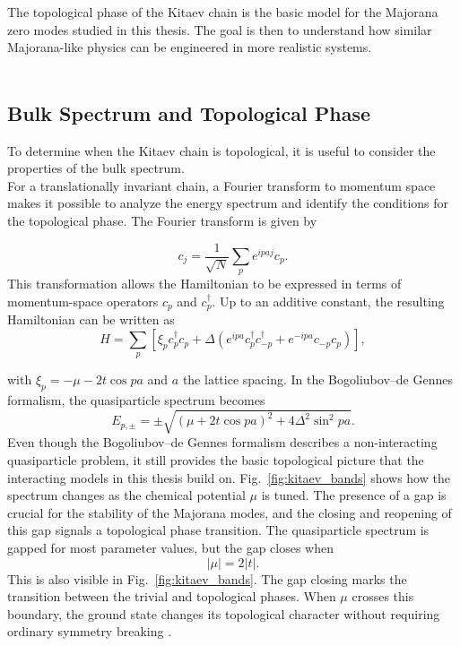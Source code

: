 The topological phase of the Kitaev chain is the basic model for the Majorana zero modes studied in this thesis. The goal is then to understand how similar Majorana-like physics can be engineered in more realistic systems.
\\ \\

\subsection{Bulk Spectrum and Topological Phase\newline}

To determine when the Kitaev chain is topological, it is useful to consider the properties of the bulk spectrum. \\ 
For a translationally invariant chain, a Fourier transform to momentum space makes it possible to analyze the energy spectrum and identify the conditions for the topological phase. The Fourier transform is given by

\begin{equation}
  c_j = \frac{1}{\sqrt{N}} \sum_p e^{ipaj} c_p.
\end{equation}
This transformation allows the Hamiltonian to be expressed in terms of momentum-space operators $c_p$ and $c_p^\dagger$. Up to an additive constant, the resulting Hamiltonian can be written as
\begin{equation}
H =
\sum_p
\left[
\xi_p c_p^\dagger c_p
+
\Delta\left(
e^{ipa}c_p^\dagger c_{-p}^\dagger
+
e^{-ipa}c_{-p}c_p
\right)
\right],
\end{equation}

with $\xi_p = -\mu - 2t \cos pa$ and $a$ the lattice spacing. In the Bogoliubov--de Gennes formalism, the quasiparticle spectrum becomes
\begin{equation}
  E_{p,\pm} = \pm \sqrt{(\mu + 2t \cos{pa})^2 + 4\Delta^2 \sin^2{pa}}.
\end{equation}
Even though the Bogoliubov--de Gennes formalism describes a non-interacting quasiparticle problem, it still provides the basic topological picture that the interacting models in this thesis build on. Fig.~\ref{fig:kitaev_bands} shows how the spectrum changes as the chemical potential $\mu$ is tuned. The presence of a gap is crucial for the stability of the Majorana modes, and the closing and reopening of this gap signals a topological phase transition.
The quasiparticle spectrum is gapped for most parameter values, but the gap closes when
\[
|\mu| = 2|t|.
\]
This is also visible in Fig.~\ref{fig:kitaev_bands}. The gap closing marks the transition between the trivial and topological phases. When $\mu$ crosses this boundary, the ground state changes its topological character without requiring ordinary symmetry breaking \cite{aguadoNewTrendsPlatforms2024}.

